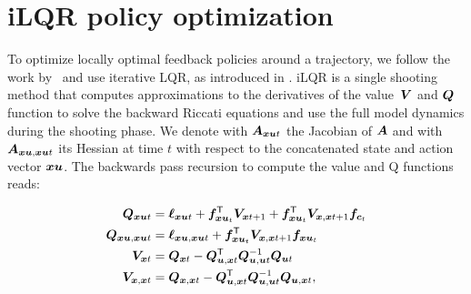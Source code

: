 \section{iLQR policy optimization}
\endgroup
\label{sec:ilq_policy_optimization}
%
%
To optimize locally optimal feedback policies around a trajectory, we follow the work by~\cite{levine2015learning}
and use iterative LQR, as introduced in \cite{li2004iterative,Sideris:2005hp}.
%
%
%
iLQR is a single shooting method that computes approximations to the derivatives of the value~$\bm{V}$ and $\bm{Q}$ function to solve the backward Riccati equations and use the full model dynamics during the shooting phase. We denote with $\bm{A}_{\bm{xu}t}$ the Jacobian of $\bm{A}$ and with $\bm{A}_{\bm{xu},\bm{xu}t}$ its Hessian at time $t$ with respect to the concatenated state and action vector $\bm{xu}$. The backwards pass recursion to compute the value and Q functions reads:

\begin{align}
\bm{Q}_{\bm{xu}t} &= \label{eq:q_xut}
  \bm{\ell}_{\bm{xu}t} + \bm{f}_{\bm{xu}_t}^\mathsf{T} \bm{V}_{\bm{x}{t+1}} +
  \bm{f}_{\bm{xu}_t}^\mathsf{T} \bm{V}_{\bm{x}, \bm{x}{t+1}} \bm{f}_{\bm{c}_t} \\
\bm{Q}_{\bm{xu}, \bm{xu}t} &= \label{eq:q_xuxut}
  \bm{\ell}_{\bm{xu}, \bm{xu}t} +
  \bm{f}_{\bm{xu}_t}^\mathsf{T} \bm{V}_{\bm{x},\bm{x}{t+1}}\bm{f}_{\bm{xu}_t} \\
\bm{V}_{\bm{x}t} &= \label{eq:v_xut}
  \bm{Q}_{\bm{x}t} - \bm{Q}^\mathsf{T}_{\bm{u},\bm{x}t} \bm{Q}^{-1}_{\bm{u},\bm{u}t} \bm{Q}_{\bm{u}t} \\
\bm{V}_{\bm{x},\bm{x}t} &= \label{eq:v_xuxut}
  \bm{Q}_{\bm{x},\bm{x}t} - \bm{Q}^\mathsf{T}_{\bm{u},\bm{x}t} \bm{Q}^{-1}_{\bm{u},\bm{u}t} \bm{Q}_{\bm{u},\bm{x}t},
\end{align}


